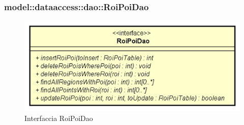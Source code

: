 \documentclass[../DefinizioneDiProdotto.tex]{subfiles}
\begin{document}
\subsubsection{model::dataaccess::dao::RoiPoiDao}

    \begin{figure}[H]
        \centering
        \includegraphics{img/RoiPoiDao.png}
        \caption{Interfaccia RoiPoiDao}\label{fig:model::dataaccess::dao::RoiPoiDao} 
    \end{figure}
\end{document}

